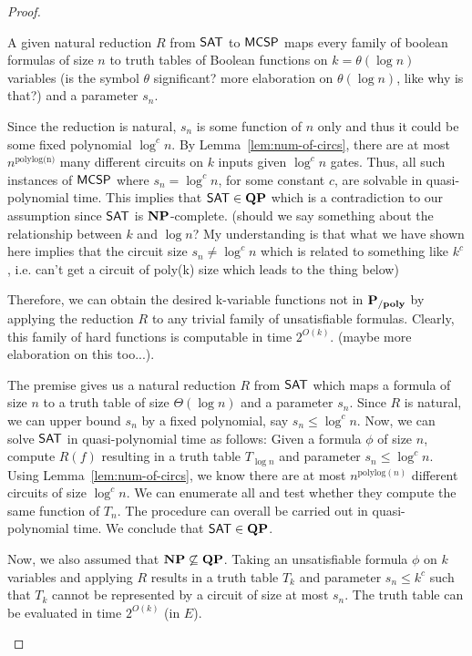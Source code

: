 \documentclass[12pt]{article}
\theoremstyle{definition}
\begin{document}
\begin{proof}
\begin{enumerate}[-]
\begin{enumerate} [+]
      {\color{gray}
		A given natural reduction $R$ from $\mathsf{SAT}$ to $\mathsf{MCSP}$ maps every family of boolean formulas of size $n$  to truth tables of Boolean functions on $k = \theta(\log n)$ variables (is the symbol $\theta$ significant? more elaboration on $\theta(\log n)$, like why is that?) and a parameter $s_n$.
		
		Since the reduction is natural, $s_n$ is some function of $n$ only and thus it could be some fixed polynomial $\log^c n$.
      By Lemma~\ref{lem:num-of-circs}, there are at most $n^{\text{polylog(n)}}$
      many different circuits on $k$ inputs given $\log^c n$ gates.
      Thus, all such instances of $\mathsf{MCSP}$ where $s_n = \log^c n$, for some constant $c$, are solvable in quasi-polynomial time. This implies that $\mathsf{SAT} \in \mathbf{QP}$ which is a contradiction to our assumption since $\mathsf{SAT}$ is $\mathbf{NP}$-complete. (should we say something about the relationship between $k$ and $\log n$? My understanding is that what we have shown here implies that the circuit size $s_n \neq \log^c n$ which is related to something like $k^c$, i.e. can't get a circuit of poly(k) size which leads to the thing below)
		
		Therefore, we can obtain the desired k-variable functions not in $\mathbf{P_{/poly}}$ by applying the reduction $R$ to any trivial family of unsatisfiable formulas. Clearly, this family of hard functions is computable in time $2^{O(k)}$. (maybe more elaboration on this too...).
      }

      {\color{orange}
      The premise gives us a natural reduction $R$ from $\mathsf{SAT}$ which maps
      a formula of size $n$ to a truth table of size $\Theta(\log n)$ and a
      parameter $s_n$.
      Since $R$ is natural, we can upper bound $s_n$ by a fixed polynomial,
      say $s_n \le \log^c n$.
      Now, we can solve $\mathsf{SAT}$ in quasi-polynomial time as follows:
      Given a formula $\phi$ of size $n$, compute $R(f)$ resulting in a truth
      table $T_{\log n}$ and parameter $s_n \le \log^c n$.
      Using Lemma~\ref{lem:num-of-circs}, we know there are at most
      $n^{\mathrm{polylog}(n)}$ different circuits of size $\log^c n$. We can
      enumerate all and test whether they compute the same function of $T_n$.
      The procedure can overall be carried out in quasi-polynomial time.
      We conclude that $\mathsf{SAT} \in \mathbf{QP}$.

      Now, we also assumed that $\mathbf{NP} \not\subseteq \mathbf{QP}$. Taking
      an unsatisfiable formula $\phi$ on $k$ variables and applying $R$ results
      in a truth table $T_k$ and parameter $s_n \le k^c$ such that $T_k$ cannot
      be represented by a circuit of size at most $s_n$.
      The truth table can be evaluated in time $2^{O(k)}$ (in $E$).
      }


\end{enumerate}
\end{enumerate}
\end{proof}
\end{document}
